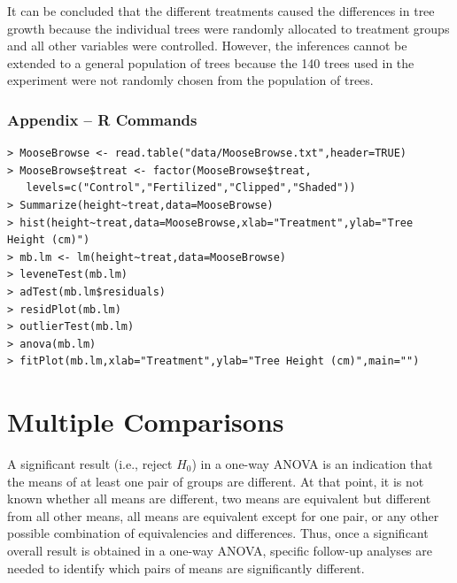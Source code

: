 \documentclass[10pt,openany]{book}\usepackage[]{graphicx}\usepackage[]{color}
\begin{document}
It can be concluded that the different treatments caused the differences in tree growth because the individual trees were randomly allocated to treatment groups and all other variables were controlled.  However, the inferences cannot be extended to a general population of trees because the 140 trees used in the experiment were not randomly chosen from the population of trees.

\vspace{-8pt}
\subsubsection*{Appendix -- R Commands}
\vspace{-8pt}
\begin{Verbatim}[formatcom=\color{red},xleftmargin=5mm,commandchars=\\\{\}]
> MooseBrowse <- read.table("data/MooseBrowse.txt",header=TRUE)
> MooseBrowse$treat <- factor(MooseBrowse$treat,
   levels=c("Control","Fertilized","Clipped","Shaded"))
> Summarize(height~treat,data=MooseBrowse)
> hist(height~treat,data=MooseBrowse,xlab="Treatment",ylab="Tree Height (cm)")
> mb.lm <- lm(height~treat,data=MooseBrowse)
> leveneTest(mb.lm)
> adTest(mb.lm$residuals)
> residPlot(mb.lm)
> outlierTest(mb.lm)
> anova(mb.lm)
> fitPlot(mb.lm,xlab="Treatment",ylab="Tree Height (cm)",main="")
\end{Verbatim}


\section{Multiple Comparisons} \label{sect:MultComp}
A significant result (i.e., reject $H_{0}$) in a one-way ANOVA is an indication that the means of at least one pair of groups are different.  At that point, it is not known whether all means are different, two means are equivalent but different from all other means, all means are equivalent except for one pair, or any other possible combination of equivalencies and differences.  Thus, once a significant overall result is obtained in a one-way ANOVA, specific follow-up analyses are needed to identify which pairs of means are significantly different.

\end{document}
